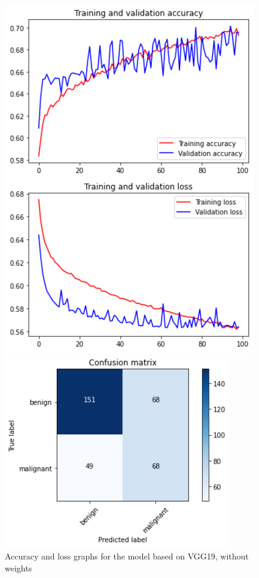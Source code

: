 \documentclass[11pt,a4paper,oneside]{article}
\begin{document}
\begin{figure}[h]
\centering
	\begin{minipage}[c]{.4\textwidth}
		\centering\setlength{\captionmargin}{0pt}%
		\includegraphics[width=.9\textwidth]{images/Task 3/VGG19 3.2/Without Weights/Accuracy}
		\caption{Accuracy and loss graphs for the model based on VGG19, without weights}
		\label{fig:vgg19_3.2_accuracy}
	\end{minipage}
	\hspace{5mm}%
	\begin{minipage}[c]{.4\textwidth}
		\centering\setlength{\captionmargin}{0pt}%
		\includegraphics[width=.9\textwidth]{images/Task 3/VGG19 3.2/Without Weights/Conf Matrix}

\end{minipage}
\end{figure}
\end{document}
